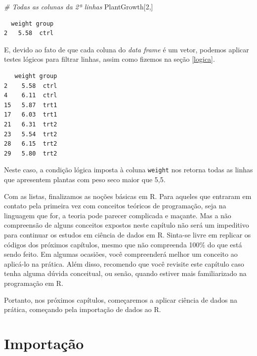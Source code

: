 \documentclass[
  brazilian,
]{book}
\newenvironment{Shaded}{\begin{snugshade}}{\end{snugshade}}
\newcommand{\CommentTok}[1]{\textcolor[rgb]{0.56,0.35,0.01}{\textit{#1}}}
\newcommand{\DecValTok}[1]{\textcolor[rgb]{0.00,0.00,0.81}{#1}}
\newcommand{\FloatTok}[1]{\textcolor[rgb]{0.00,0.00,0.81}{#1}}
\newcommand{\NormalTok}[1]{#1}
\newcommand{\SpecialCharTok}[1]{\textcolor[rgb]{0.00,0.00,0.00}{#1}}
\begin{document}
\begin{Shaded}
\begin{Highlighting}[]
\CommentTok{\# Todas as colunas da 2ª linhas}
\NormalTok{PlantGrowth[}\DecValTok{2}\NormalTok{,]}
\end{Highlighting}
\end{Shaded}

\begin{verbatim}
  weight group
2   5.58  ctrl
\end{verbatim}

E, devido ao fato de que cada coluna do \emph{data frame} é um vetor, podemos aplicar testes lógicos para filtrar linhas, assim como fizemos na seção \ref{logica}.

\begin{Shaded}
\end{Shaded}

\begin{verbatim}
   weight group
2    5.58  ctrl
4    6.11  ctrl
15   5.87  trt1
17   6.03  trt1
21   6.31  trt2
23   5.54  trt2
28   6.15  trt2
29   5.80  trt2
\end{verbatim}

Neste caso, a condição lógica imposta à coluna \texttt{weight} nos retorna todas as linhas que apresentem plantas com peso seco maior que 5,5.

Com as listas, finalizamos as noções básicas em R. Para aqueles que entraram em contato pela primeira vez com conceitos teóricos de programação, seja na linguagem que for, a teoria pode parecer complicada e maçante. Mas a não compreensão de alguns conceitos expostos neste capítulo não será um impeditivo para continuar os estudos em ciência de dados em R. Sinta-se livre em replicar os códigos dos próximos capítulos, mesmo que não compreenda 100\% do que está sendo feito. Em algumas ocasiões, você compreenderá melhor um conceito ao aplicá-lo na prática. Além disso, recomendo que você revisite este capítulo caso tenha alguma dúvida conceitual, ou senão, quando estiver mais familiarizado na programação em R.

Portanto, nos próximos capítulos, começaremos a aplicar ciência de dados na prática, começando pela importação de dados ao R.

\hypertarget{import}{%
\chapter{Importação}\label{import}}
\end{document}
